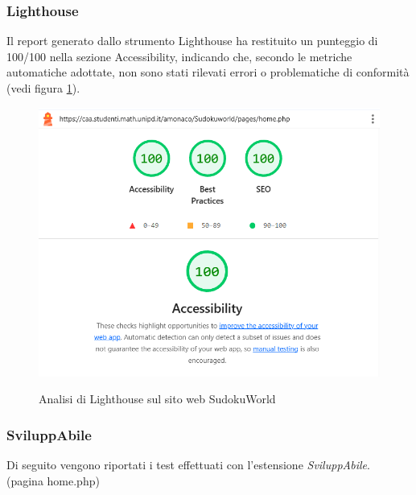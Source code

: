 \subsubsection{Lighthouse}
\noindent Il report generato dallo strumento Lighthouse ha restituito un punteggio di 100/100 nella sezione Accessibility, indicando che, secondo le metriche automatiche adottate, non sono stati rilevati errori o problematiche di conformità (vedi figura \ref{fig:Lighthouse_sudoku}).
\begin{figure}[H]
    \centering
    \includegraphics[width=0.6\linewidth, alt={Screenshot dell'analisi di Lighthouse sul sito web SudokuWorld}]{img/Lighthouse_sudoku.png}
    \caption{Analisi di Lighthouse sul sito web SudokuWorld}\label{fig:Lighthouse_sudoku}
\end{figure}

\subsubsection{SviluppAbile}
\noindent Di seguito vengono riportati i test effettuati con l'estensione \textit{SviluppAbile}. \newline
\\ \vspace{-0.5cm}
\noindent(pagina home.php)
